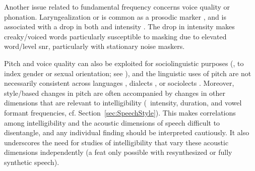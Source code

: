 
Another issue related to fundamental frequency concerns voice quality or phonation.  Laryngealization or  is common as a prosodic marker \citep{Lehiste1979, Kreiman1982, DilleyEtAl1996}, and is associated with a drop in both \fo{} and intensity \citep{GordonLadefoged2001}.  The drop in intensity makes creaky\-/voiced words particularly susceptible to masking due to elevated word\-/level \ac{snr}, particularly with stationary noise maskers.  %

Pitch and voice quality can also be exploited for sociolinguistic purposes (\ie, to index gender or sexual orientation; see \citealt[\intal]{McconnellGinet1978, Gaudio1994, Podesva2011}), and the linguistic uses of pitch are not necessarily consistent across languages \citep{MajewskiEtAl1972, Todaka1993, Yuasa2008, KeatingKuo2012}, dialects \citep{GrabePost2002, ClopperSmiljanic2011}, or sociolects \citep{McLemore1991, Britain2008}.  %
Moreover, style\-/based changes in pitch are often accompanied by changes in other dimensions that are relevant to intelligibility (\viz\ intensity, duration, and vowel formant frequencies, cf. Section~\ref{sec:SpeechStyle}).  This makes correlations among intelligibility and the acoustic dimensions of speech difficult to disentangle, and any individual finding should be interpreted cautiously.  It also underscores the need for studies of intelligibility that vary these acoustic dimensions independently (a feat only possible with resynthesized or fully synthetic speech).

